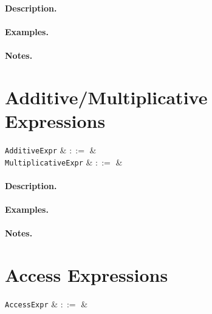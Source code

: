 \paragraph{Description.}

\paragraph{Examples.}

\paragraph{Notes.} 


\section{Additive/Multiplicative Expressions}

\begin{syntax}
  \verb+AdditiveExpr+ & $::=$ &\\
  \verb+MultiplicativeExpr+ & $::=$ &\\
\end{syntax}

\paragraph{Description.}

\paragraph{Examples.}

\paragraph{Notes.} 


\section{Access Expressions}

\begin{syntax}
  \verb+AccessExpr+ & $::=$ &\\
\end{syntax}

